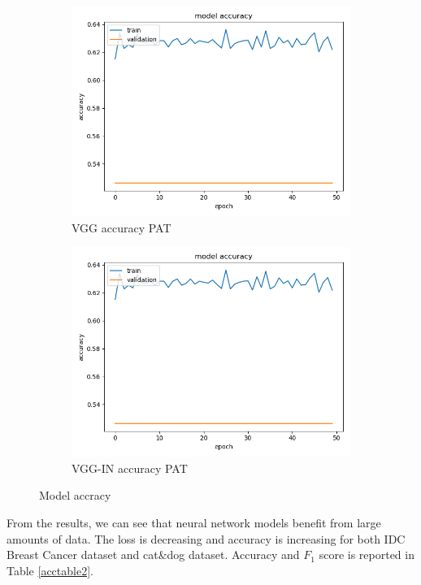 \begin{figure}[h]
\begin{subfigure}[b]{.24\linewidth}
\includegraphics[width=\linewidth]{Figs/vgg_pat_acc.jpg}
\caption{VGG accuracy PAT}
\end{subfigure}
\begin{subfigure}[b]{.24\linewidth}
\includegraphics[width=\linewidth]{Figs/vgg_pat_acc.jpg}
\caption{VGG-IN accuracy PAT}
\end{subfigure}
\caption{Model accracy}
\label{fig:acc2}
\end{figure}

From the results, we can see that neural network models benefit from large amounts of data. The loss is decreasing and accuracy is increasing for both IDC Breast Cancer dataset and cat\&dog dataset. Accuracy and $F_1$ score is reported in Table \ref{acctable2}.


